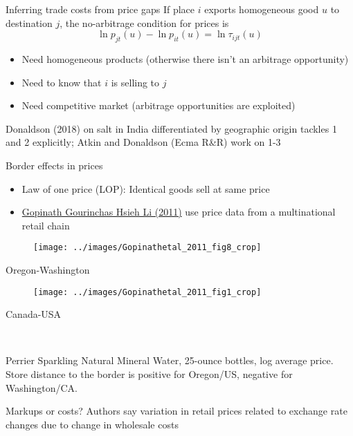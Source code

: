 \documentclass[10pt,notes=hide]{beamer}
\begin{document}
\begin{frame}{Inferring trade costs from price gaps}
If place $i$ exports homogeneous good $u$ to destination $j$, 
the no-arbitrage condition for prices is
$$\ln p_{jt}(u) -\ln p_{it}(u) = \ln \tau_{ijt}(u)$$
\vspace{-6mm}
\begin{itemize}
	\item Need homogeneous products (otherwise there isn't an arbitrage opportunity)
	\item Need to know that $i$ is selling to $j$
	\item Need competitive market (arbitrage opportunities are exploited)
\end{itemize}
Donaldson (2018) on salt in India differentiated by geographic origin tackles 1 and 2 explicitly; 
Atkin and Donaldson (Ecma R\&R) work on 1-3
\end{frame}
\begin{frame}{Border effects in prices}
\begin{itemize}
	\item Law of one price (LOP): Identical goods sell at same price
	\item \href{https://www.aeaweb.org/articles?id=10.1257/aer.101.6.2450}{Gopinath Gourinchas Hsieh Li (2011)} use price data from a multinational retail chain
\end{itemize}
	\begin{minipage}{.45\textwidth} \begin{center}\begin{figure} \texttt{[image: ../images/Gopinathetal\_2011\_fig8\_crop]}\end{figure} Oregon-Washington \end{center} \end{minipage}
	\begin{minipage}{.45\textwidth} \begin{center}\begin{figure} \texttt{[image: ../images/Gopinathetal\_2011\_fig1\_crop]}\end{figure} Canada-USA \end{center} \end{minipage} \\ \vspace{0.1in}
	{\scriptsize Perrier Sparkling Natural Mineral Water, 25-ounce bottles, log average price. Store distance to the border is positive for Oregon/US, negative for Washington/CA. \par }
Markups or costs? Authors say variation in retail prices related to exchange rate changes due to change in wholesale costs
\end{frame}
\end{document}
